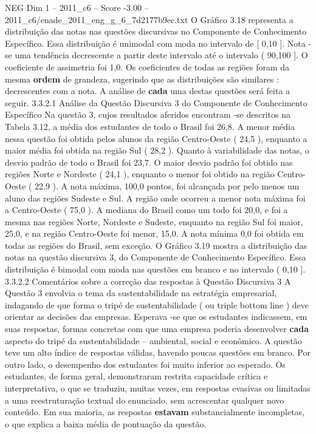 \begin{textsample}{NEG Dim 1 – 2011\_c6 – Score -3.00 – 2011\_c6/enade\_2011\_eng\_g\_6\_7d2177b9ec.txt}
O Gráfico 3.18 representa a distribuição das notas nas questões discursivas no Componente de Conhecimento Específico.
Essa distribuição é unimodal com moda no intervalo de [ 0,10 ].
Nota -se uma tendência decrescente a partir deste intervalo até o intervalo ( 90,100 ].
O coeficiente de assimetria foi 1,0.
Os coeficientes de todas as regiões foram da mesma \textbf{ordem} de grandeza, sugerindo que as distribuições são similares : decrescentes com a nota.
A análise de \textbf{cada} uma destas questões será feita a seguir. 3.3.2.1 Análise da Questão Discursiva 3 do Componente de Conhecimento Específico Na questão 3, cujos resultados aferidos encontram -se descritos na Tabela 3.12, a média dos estudantes de todo o Brasil foi 26,8.
A menor média nessa questão foi obtida pelos alunos da região Centro-Oeste ( 24,5 ), enquanto a maior média foi obtida na região Sul ( 28,2 ).
Quanto à variabilidade das notas, o desvio padrão de todo o Brasil foi 23,7.
O maior desvio padrão foi obtido nas regiões Norte e Nordeste ( 24,1 ), enquanto o menor foi obtido na região Centro-Oeste ( 22,9 ).
A nota máxima, 100,0 pontos, foi alcançada por pelo menos um aluno das regiões Sudeste e Sul.
A região onde ocorreu a menor nota máxima foi a Centro-Oeste ( 75,0 ).
A mediana do Brasil como um todo foi 20,0, e foi a mesma nas regiões Norte, Nordeste e Sudeste, enquanto na região Sul foi maior, 25,0, e na região Centro-Oeste foi menor, 15,0.
A nota mínima 0,0 foi obtida em todas as regiões do Brasil, sem exceção.
O Gráfico 3.19 mostra a distribuição das notas na questão discursiva 3, do Componente de Conhecimento Específico.
Essa distribuição é bimodal com moda nas questões em branco e no intervalo ( 0,10 ]. 3.3.2.2 Comentários sobre a correção das respostas à Questão Discursiva 3 A Questão 3 envolvia o tema da sustentabilidade na estratégia empresarial, indagando de que forma o tripé de sustentabilidade ( ou triple bottom line ) deve orientar as decisões das empresas.
Esperava -se que os estudantes indicassem, em suas respostas, formas concretas com que uma empresa poderia desenvolver \textbf{cada} aspecto do tripé da sustentabilidade – ambiental, social e econômico.
A questão teve um alto índice de respostas válidas, havendo poucas questões em branco.
Por outro lado, o desempenho dos estudantes foi muito inferior ao esperado.
Os estudantes, de forma geral, demonstraram restrita capacidade crítica e interpretativa, o que se traduziu, muitas vezes, em respostas evasivas ou limitadas a uma reestruturação textual do enunciado, sem acrescentar qualquer novo conteúdo.
Em sua maioria, as respostas \textbf{estavam} substancialmente incompletas, o que explica a baixa média de pontuação da questão.

\end{textsample}
